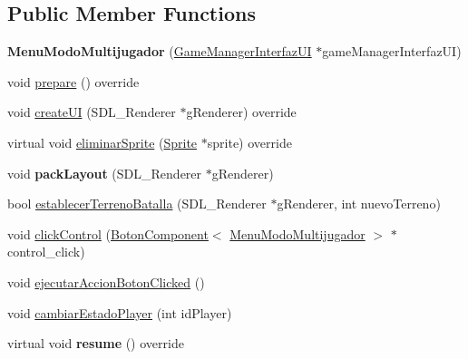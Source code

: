 \subsection*{Public Member Functions}
\begin{DoxyCompactItemize}
\item 
{\bfseries Menu\+Modo\+Multijugador} (\hyperlink{class_game_manager_interfaz_u_i}{Game\+Manager\+Interfaz\+UI} $\ast$game\+Manager\+Interfaz\+UI)\hypertarget{class_menu_modo_multijugador_aa9376a8627b1b6bd15beecc392fe3721}{}\label{class_menu_modo_multijugador_aa9376a8627b1b6bd15beecc392fe3721}

\item 
void \hyperlink{class_menu_modo_multijugador_a422baa9893784cacd414b13fbd34e7d2}{prepare} () override
\item 
void \hyperlink{class_menu_modo_multijugador_aa87c06427be64fd73e17d9ea37d8744e}{create\+UI} (S\+D\+L\+\_\+\+Renderer $\ast$g\+Renderer) override
\item 
virtual void \hyperlink{class_menu_modo_multijugador_a0957d2b62ca4851a3a868403767c9d61}{eliminar\+Sprite} (\hyperlink{class_sprite}{Sprite} $\ast$sprite) override
\item 
void {\bfseries pack\+Layout} (S\+D\+L\+\_\+\+Renderer $\ast$g\+Renderer)\hypertarget{class_menu_modo_multijugador_a2a13518afeedfeab61b030c376ee35e2}{}\label{class_menu_modo_multijugador_a2a13518afeedfeab61b030c376ee35e2}

\item 
bool \hyperlink{class_menu_modo_multijugador_a77f0be9bcdc3fbdf3130a024ef25bef5}{establecer\+Terreno\+Batalla} (S\+D\+L\+\_\+\+Renderer $\ast$g\+Renderer, int nuevo\+Terreno)
\item 
void \hyperlink{class_menu_modo_multijugador_a3aee7e0e5ab94f1e866f9306aabed208}{click\+Control} (\hyperlink{class_boton_component}{Boton\+Component}$<$ \hyperlink{class_menu_modo_multijugador}{Menu\+Modo\+Multijugador} $>$ $\ast$control\+\_\+click)
\item 
void \hyperlink{class_menu_modo_multijugador_a589a0611b7f3cf2978ff1ab72ce3b35c}{ejecutar\+Accion\+Boton\+Clicked} ()
\item 
void \hyperlink{class_menu_modo_multijugador_a6e483dbb12275b6e00be0f9fb430dd7e}{cambiar\+Estado\+Player} (int id\+Player)
\item 
virtual void {\bfseries resume} () override\hypertarget{class_menu_modo_multijugador_a61af68ebd0132c9ee7fc4c505e2befa0}{}\label{class_menu_modo_multijugador_a61af68ebd0132c9ee7fc4c505e2befa0}


\end{DoxyCompactItemize}
